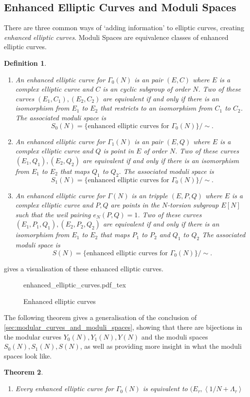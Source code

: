 \documentclass[a4paper]{article}
\newcommand{\incfig}[1]{%
	\def\svgwidth{\columnwidth}
	{#1.pdf_tex}
}
\theoremstyle{theoremdd}
\newtheorem{theorem}{Theorem}[section]
\theoremstyle{definitiondd}
\newtheorem{definition}[theorem]{Definition}
\theoremstyle{remarkdd}
\begin{document}
\subsection{Enhanced Elliptic Curves and Moduli Spaces} \label{sec:enhanced_elliptic_curves_and_moduli_spaces}
There are three common ways of `adding information' to elliptic curves, creating \emph{enhanced elliptic curves}. Moduli Spaces are equivalence classes of enhanced elliptic curves.  
\begin{definition} \hspace{\linewidth}
	\begin{enumerate}
		\item An \emph{enhanced elliptic curve for $\Gamma_0(N)$} is an pair $(E, C)$ where  $E$ is a complex elliptic curve and $C$ is an cyclic subgroup of order $N$.
		Two of these curves $(E_1, C_1), (E_2, C_2)$ are equivalent if and only if there is an isomorphism from $E_1$ to $E_2$ that restricts to an isomorphism from $C_1$ to $C_2$.
		The associated \emph{moduli space} is \[
			S_0(N) = \{ \text{enhanced elliptic curves for } \Gamma_0(N)\} / \sim
		.\] 
	\item An \emph{enhanced elliptic curve for $\Gamma_1(N)$} is an pair $(E, Q)$ where  $E$ is a complex elliptic curve and $Q$ is point in $E$ of order $N$.
		Two of these curves $(E_1, Q_1), (E_2, Q_2)$ are equivalent if and only if there is an isomorphism from $E_1$ to $E_2$ that maps $Q_1$ to $Q_2$.
		The associated \emph{moduli space} is \[
			S_1(N) = \{ \text{enhanced elliptic curves for } \Gamma_0(N)\} / \sim
		.\] 
	\item An \emph{enhanced elliptic curve for $\Gamma(N)$} is an tripple $(E, P, Q)$ where  $E$ is a complex elliptic curve and $P, Q$ are points in the $N$-torsion subgroup $E[N]$ such  that the weil pairing  $e_N(P, Q) = 1$.
		Two of these curves $(E_1, P_1, Q_1), (E_2, P_2, Q_2)$ are equivalent if and only if there is an isomorphism from $E_1$ to $E_2$ that maps $P_1$ to $P_2$ and $Q_1$ to $Q_2$
		The associated \emph{moduli space} is \[
			S(N) = \{ \text{enhanced elliptic curves for } \Gamma_0(N)\} / \sim
		.\] 
	\end{enumerate}	
\end{definition}
 gives a visualisation of these enhanced elliptic curves.
\begin{figure}[h]
	\centering
	\incfig{enhanced_elliptic_curves}
	\caption{Enhanced elliptic curves}
	\label{fig:enhanced_elliptic_curves}
\end{figure}
The following theorem gives a generalisation of the conclusion of \cref{sec:modular_curves_and_moduli_spaces}, showing that there are bijections in the modular curves $Y_0(N), Y_1(N), Y(N)$ and the moduli spaces $S_0(N), S_1(N), S(N)$, as well as providing more insight in what the moduli spaces look like. 
\begin{theorem}
	\hspace{\linewidth}
	\begin{enumerate}
		\item Every enhanced elliptic curve for $\Gamma_0(N)$ is equivalent to $(E_\tau, \left<1 / N + \Lambda_\tau \right>$ 
	\end{enumerate}
\end{theorem}
\end{document}
